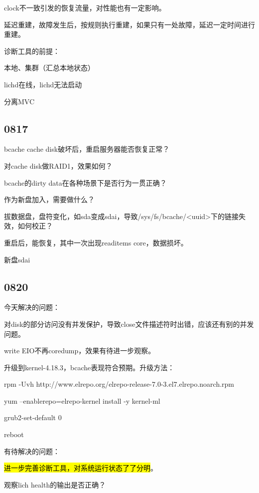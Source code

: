clock不一致引发的恢复流量，对性能也有一定影响。

延迟重建，故障发生后，按规则执行重建，如果只有一处故障，延迟一定时间进行重建。

诊断工具的前提：
\begin{enumbox}
\item 本地、集群（汇总本地状态）
\item lichd在线，lichd无法启动
\item 分离MVC
\end{enumbox}

\subsection{0817}

\begin{enumbox}
\item bcache cache disk破坏后，重启服务器能否恢复正常？
\item 对cache disk做RAID1，效果如何？
\item bcache的dirty data在各种场景下是否行为一贯正确？
\item 作为新盘加入，需要做什么？
\end{enumbox}

拔数据盘，盘符变化，如sda变成sdai，导致/sys/fs/bcache/<uuid>下的链接失效，如何校正？

重启后，能恢复，其中一次出现readitems core，数据损坏。

新盘sdai

\subsection{0820}

今天解决的问题：
\begin{enumbox}
\item 对disk的部分访问没有并发保护，导致close文件描述符时出错，应该还有别的并发问题。
\item write EIO不再coredump，效果有待进一步观察。
\end{enumbox}

升级到kernel-4.18.3，bcache表现符合预期。升级方法：
\begin{itembox}
\item rpm -Uvh http://www.elrepo.org/elrepo-release-7.0-3.el7.elrepo.noarch.rpm
\item yum --enablerepo=elrepo-kernel install -y kernel-ml
\item grub2-set-default 0
\item reboot
\end{itembox}

有待解决的问题：
\begin{enumbox}
\item \hl{进一步完善诊断工具，对系统运行状态了了分明}。
\item 观察lich health的输出是否正确？
\end{enumbox}
